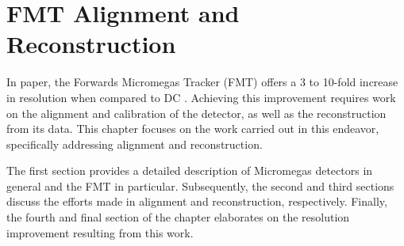 \section{FMT Alignment and Reconstruction}
\label{sec::fmt_alignment_and_reconstruction}
    In paper, the Forwards Micromegas Tracker (FMT) offers a 3 to 10-fold increase in resolution when compared to DC \cite{aune2009}.
    Achieving this improvement requires work on the alignment and calibration of the detector, as well as the reconstruction from its data.
    This chapter focuses on the work carried out in this endeavor, specifically addressing alignment and reconstruction.

    The first section provides a detailed description of Micromegas detectors in general and the FMT in particular.
    Subsequently, the second and third sections discuss the efforts made in alignment and reconstruction, respectively.
    Finally, the fourth and final section of the chapter elaborates on the resolution improvement resulting from this work.

    
    
    
    
